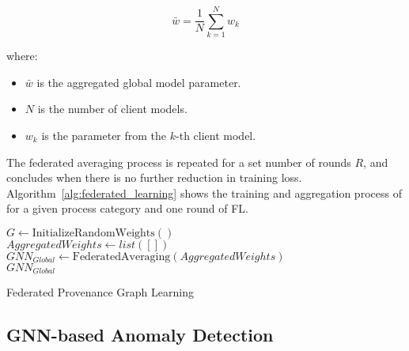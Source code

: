 \begin{equation}
\bar{w} = \frac{1}{N} \sum_{k=1}^{N}w_k
\end{equation}

where:
\begin{itemize}
    \item \(\bar{w}\) is the aggregated global model parameter.
    \item \(N\) is the number of client models.
    \item \(w_k\) is the parameter from the \(k\)-th client model.
\end{itemize}

The federated averaging process is repeated for a set number of rounds \(R\), and concludes when there is no further reduction in training loss. Algorithm~\ref{alg:federated_learning} shows the training and aggregation process of \gnnshort for a given process category and one round of FL.

\begin{algorithm}[!t]
  \footnotesize
  \DontPrintSemicolon
  \BlankLine
  $G \leftarrow \text{InitializeRandomWeights}()$\\
  \BlankLine
  $AggregatedWeights \leftarrow list([])$\\
  $GNN_{Global} \leftarrow \text{FederatedAveraging}(AggregatedWeights)$\\
  \BlankLine
  \Return $GNN_{Global}$\\
  \BlankLine
  \caption{Federated Provenance Graph Learning}
  \label{alg:federated_learning}
\end{algorithm}

\subsection{GNN-based Anomaly Detection}
\label{sys:anomaly_detection}

